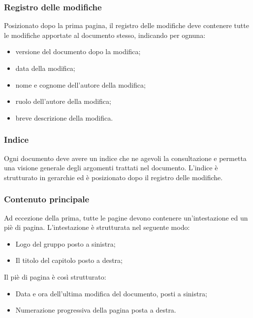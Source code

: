 \documentclass[NormediProgetto.tex]{subfiles}
\begin{document}
\subsubsection{Registro delle modifiche}

Posizionato dopo la prima pagina, il registro delle modifiche deve contenere tutte le modifiche apportate al documento stesso, indicando per ognuna:

\begin{itemize}
\item versione del documento dopo la modifica;
\item data della modifica;
\item nome e cognome dell'autore della modifica;
\item ruolo dell'autore della modifica;
\item breve descrizione della modifica.
\end{itemize}

\subsubsection{Indice}

Ogni documento deve avere un indice che ne agevoli la consultazione e permetta una visione generale degli argomenti trattati nel documento. L'indice è strutturato in gerarchie ed è posizionato dopo il registro delle modifiche.

\subsubsection{Contenuto principale}

 Ad eccezione della prima, tutte le pagine devono contenere un’intestazione ed un piè di pagina. L’intestazione è strutturata nel seguente modo: 

\begin{itemize}
\item Logo del gruppo posto a sinistra;
\item Il titolo del capitolo posto a destra;
\end{itemize}

Il piè di pagina è così strutturato:

\begin{itemize}
\item Data e ora dell'ultima modifica del documento, posti a sinistra;
\item Numerazione progressiva della pagina posta a destra.
\end{itemize}
\end{document}
